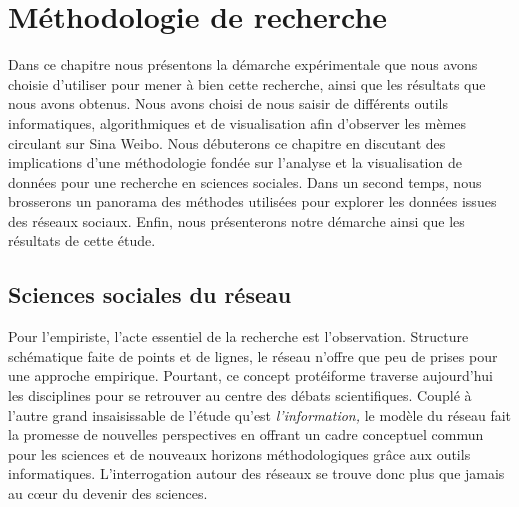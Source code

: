 \chapter{M\'ethodologie de recherche}

Dans ce chapitre nous pr\'esentons la d\'emarche exp\'erimentale que
nous avons choisie d{\textquoteright}utiliser pour mener \`a bien cette
recherche, ainsi que les r\'esultats que nous avons obtenus. Nous avons
choisi de nous saisir de diff\'erents outils informatiques,
algorithmiques et de visualisation afin d{\textquoteright}observer les
m\`emes circulant sur Sina Weibo. Nous d\'ebuterons ce chapitre en
discutant des implications d{\textquoteright}une m\'ethodologie
fond\'ee sur l{\textquoteright}analyse et la visualisation de donn\'ees
pour une recherche en sciences sociales. Dans un second temps, nous
brosserons un panorama des m\'ethodes utilis\'ees pour explorer les
donn\'ees issues des r\'eseaux sociaux. Enfin, nous pr\'esenterons
notre d\'emarche ainsi que les r\'esultats de cette \'etude.

\section[Sciences sociales du r\'eseau]{Sciences sociales du r\'eseau}
Pour l{\textquoteright}empiriste, l{\textquoteright}acte essentiel de la
recherche est l{\textquoteright}observation. Structure sch\'ematique
faite de points et de lignes, le r\'eseau n{\textquoteright}offre que
peu de prises pour une approche empirique. Pourtant, ce concept
prot\'eiforme traverse aujourd{\textquoteright}hui les disciplines pour
se retrouver au centre des d\'ebats scientifiques. Coupl\'e \`a
l{\textquoteright}autre grand insaisissable de
l{\textquoteright}\'etude qu{\textquoteright}est
\textit{l{\textquoteright}information, }le mod\`ele du r\'eseau fait la
promesse de nouvelles perspectives en offrant un cadre conceptuel
commun pour les sciences et de nouveaux horizons m\'ethodologiques
gr\^ace aux outils informatiques. L{\textquoteright}interrogation
autour des r\'eseaux se trouve donc plus que jamais au c{\oe}ur du
devenir des sciences.

